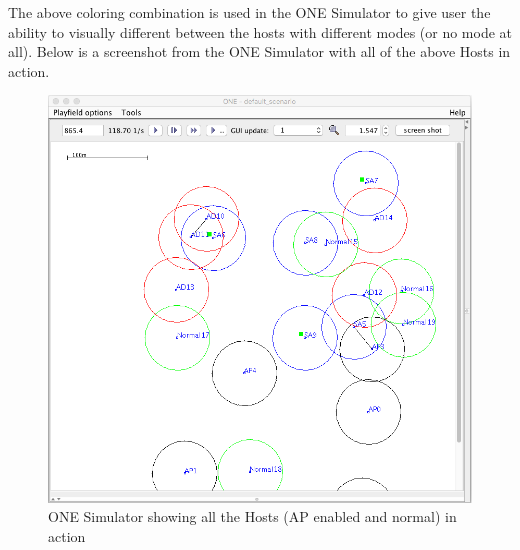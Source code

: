 	\newpage
	The above coloring combination is used in the ONE Simulator to give user the ability to visually different between the hosts with different modes (or no mode at all). Below is a screenshot from the ONE Simulator with all of the above Hosts in action.
	\begin{figure}[h]
		\centering
		\includegraphics[scale=0.5]{./figures/aps-2}
		\caption{ONE Simulator showing all the Hosts (AP enabled and normal) in action}
	\end{figure}
\newpage
